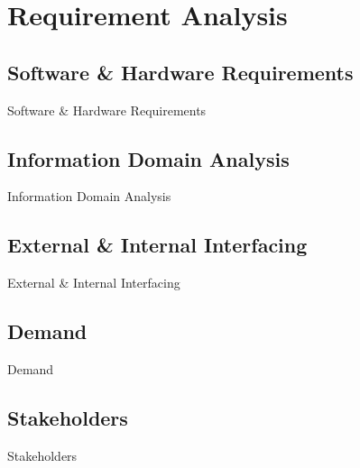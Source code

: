 \section{Requirement Analysis}

\subsection{Software \& Hardware Requirements}
\begin{frame}{Software \& Hardware Requirements}

\end{frame}

\subsection{Information Domain Analysis}
\begin{frame}{Information Domain Analysis}

\end{frame}

\subsection{External \& Internal Interfacing}
\begin{frame}{External \& Internal Interfacing}

\end{frame}

\subsection{Demand}
\begin{frame}{Demand}

\end{frame}

\subsection{Stakeholders}
\begin{frame}{Stakeholders}

\end{frame}